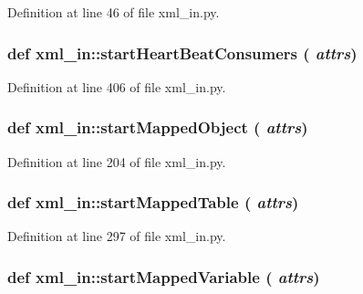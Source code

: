 Definition at line 46 of file xml\_\-in.py.\hypertarget{namespacexml__in_a29dbd3a28381042f0922702dd79eb8a}{
\subsubsection[startHeartBeatConsumers]{\setlength{\rightskip}{0pt plus 5cm}def xml\_\-in::start\-Heart\-Beat\-Consumers ( {\em attrs})}}
\label{namespacexml__in_a29dbd3a28381042f0922702dd79eb8a}




Definition at line 406 of file xml\_\-in.py.\hypertarget{namespacexml__in_c590c2898e7e2c81fb741dded42e9139}{
\subsubsection[startMappedObject]{\setlength{\rightskip}{0pt plus 5cm}def xml\_\-in::start\-Mapped\-Object ( {\em attrs})}}
\label{namespacexml__in_c590c2898e7e2c81fb741dded42e9139}




Definition at line 204 of file xml\_\-in.py.\hypertarget{namespacexml__in_cab6ba5f6bd741bbe97aa9d1af78194f}{
\subsubsection[startMappedTable]{\setlength{\rightskip}{0pt plus 5cm}def xml\_\-in::start\-Mapped\-Table ( {\em attrs})}}
\label{namespacexml__in_cab6ba5f6bd741bbe97aa9d1af78194f}




Definition at line 297 of file xml\_\-in.py.\hypertarget{namespacexml__in_df5fbbfd3c5f6bbe0205f2926dc443d1}{
\subsubsection[startMappedVariable]{\setlength{\rightskip}{0pt plus 5cm}def xml\_\-in::start\-Mapped\-Variable ( {\em attrs})}}
\label{namespacexml__in_df5fbbfd3c5f6bbe0205f2926dc443d1}




